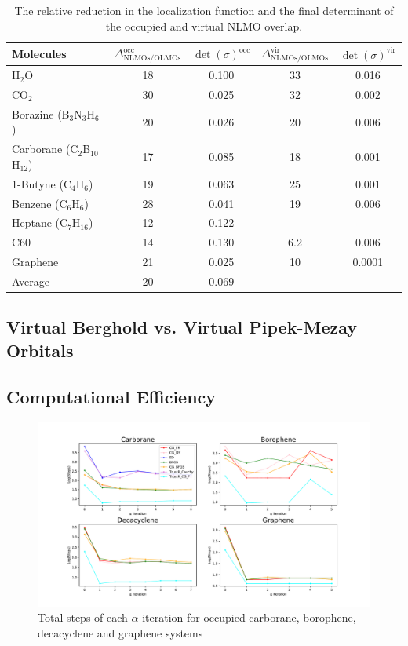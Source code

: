 \documentclass[aps,prl,reprint,amsmath,amssymb]{revtex4-1}
\begin{document}
\begin{table}[htbp]
\caption{The relative reduction in the localization function and the final determinant of the occupied and virtual NLMO overlap.}
\label{tab:loc}
\centering
\begin{tabular}{l c c c c}
\hline\hline
Molecules & $\Delta_{\text{NLMOs/OLMOs}}^{\text{occ}}$ & $\det(\sigma)^{\text{occ}} $ & $\Delta_{\text{NLMOs/OLMOs}}^{\text{vir}}$ & $\det(\sigma)^{\text{vir}}$ \\
\hline
H$_2$O & 18 & 0.100 & 33 & 0.016 \\ 
CO$_2$ & 30 & 0.025 & 32 & 0.002\\
Borazine (B$_3$N$_3$H$_6$) & 20 & 0.026 & 20 & 0.006 \\
Carborane (C$_2$B$_{10}$H$_{12}$) & 17 & 0.085 & 18 & 0.001 \\ 
1-Butyne (C$_4$H$_6$) & 19 & 0.063 & 25 & 0.001 \\
Benzene (C$_6$H$_6$) & 28 & 0.041 & 19 & 0.006 \\ 
Heptane (C$_7$H$_{16}$) & 12 & 0.122 & & \\ 
C60 & 14 & 0.130 & 6.2 & 0.006 \\
Graphene & 21 & 0.025 & 10 & 0.0001 \\
\hline
Average & 20 & 0.069 & & \\
\hline
\hline
\end{tabular}
\label{table:nonlin}
\end{table}

\subsection{Virtual Berghold vs. Virtual Pipek-Mezay Orbitals}

\subsection{Computational Efficiency}
\begin{figure}[htb]
\centering
\includegraphics[width=\textwidth]{occupied_iter.pdf}
\caption{Total steps of each $\alpha$ iteration for occupied carborane, borophene, decacyclene and graphene systems}
\label{fig:occ_iter}
\end{figure}
\end{document}

